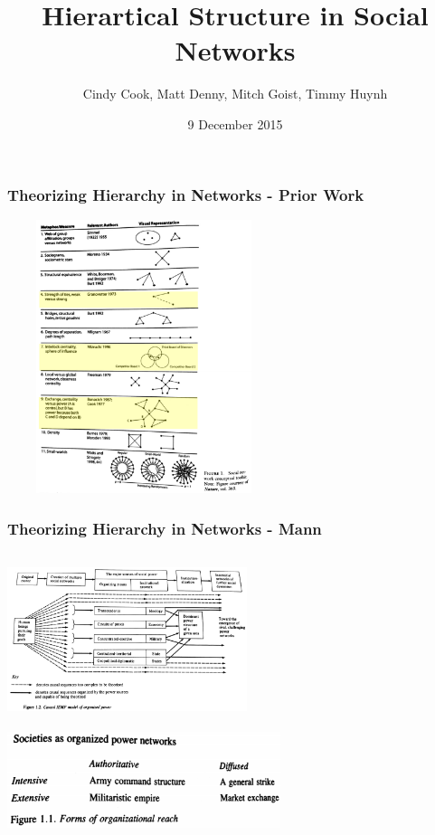 \documentclass{beamer}
\title[Hierartical Structure in Social Networks]{Hierartical Structure in Social Networks}
\author{Cindy Cook, Matt Denny, Mitch Goist, Timmy Huynh}
\institute{SODA502:  Final Project}
\date{9 December 2015}
\newenvironment{changemargin}[2]{%
	\begin{list}{}{%
			\setlength{\topsep}{0pt}%
			\setlength{\leftmargin}{#1}%
			\setlength{\rightmargin}{#2}%
			\setlength{\listparindent}{\parindent}%
			\setlength{\itemindent}{\parindent}%
			\setlength{\parsep}{\parskip}%
		}%
		\item[]}{\end{list}}
\begin{document}
		
		\frame{\titlepage}
\begin{frame}\frametitle{Theorizing Hierarchy in Networks - Prior Work}
	\begin{changemargin}{-2cm}{ -2cm}
		\centering
		\includegraphics[width=8cm, height=8cm]{images/table_overview.png} 
	\end{changemargin}
\end{frame}

\begin{frame}\frametitle{Theorizing Hierarchy in Networks - Mann}
	\begin{changemargin}{-2cm}{ -2cm}
		\centering
		\hspace{-5cm}
		\includegraphics[width=7cm, height=5cm]{images/mann_overview.png} \\
		\hspace{5cm} \includegraphics[width=8cm, height=3cm]{images/mann_typologies.png}
	\end{changemargin}
\end{frame}
\end{document}
